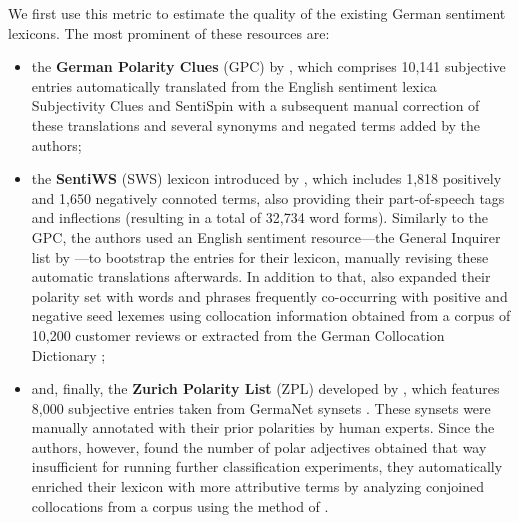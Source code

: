 We first use this metric to estimate the quality of the existing
German sentiment lexicons.  The most prominent of these resources are:
\begin{itemize}
\item the \textbf{German Polarity Clues} (GPC) by
  \citet{Waltinger:10}, which comprises 10,141 subjective entries
  automatically translated from the English sentiment lexica
  Subjectivity Clues \cite{Wilson:05} and SentiSpin \cite{Takamura:05}
  with a subsequent manual correction of these translations and
  several synonyms and negated terms added by the authors;

\item the \textbf{SentiWS} (SWS) lexicon introduced by
  \citet{Remus:10}, which includes 1,818 positively and 1,650
  negatively connoted terms, also providing their part-of-speech tags
  and inflections (resulting in a total of 32,734 word forms).
  Similarly to the GPC, the authors used an English sentiment
  resource---the General Inquirer list by \citet{Stone:66}---to
  bootstrap the entries for their lexicon, manually revising these
  automatic translations afterwards.  In addition to that,
  \citet{Remus:10} also expanded their polarity set with words and
  phrases frequently co-occurring with positive and negative seed
  lexemes using collocation information obtained from a corpus of
  10,200 customer reviews or extracted from the German Collocation
  Dictionary \cite{Quasthoff:10};

\item and, finally, the \textbf{Zurich Polarity List} (ZPL) developed
  by \citet{Clematide:10}, which features 8,000 subjective entries
  taken from GermaNet synsets \cite{Hamp:97}.  These synsets were
  manually annotated with their prior polarities by human experts.
  Since the authors, however, found the number of polar adjectives
  obtained that way insufficient for running further classification
  experiments, they automatically enriched their lexicon with more
  attributive terms by analyzing conjoined collocations from a corpus
  using the method of \citet{Hatzivassi:97}.
\end{itemize}


